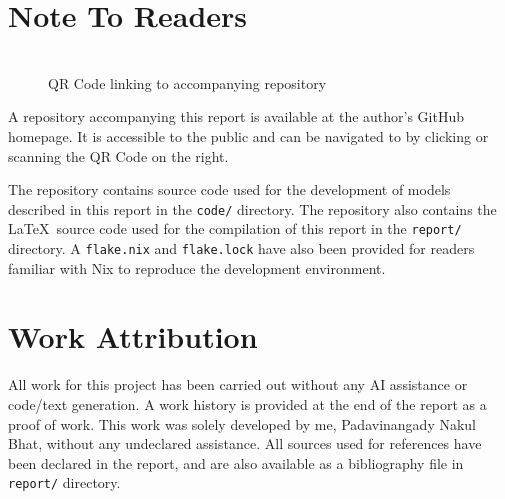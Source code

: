 \begin{abstract}
    This report covers the topics presented in
    the ``Introductions to Large Language Models''
    course taught by Tanmoy Chakraborty and
    Soumen Chakrabarti, available on NPTEL.
    As a graded assignment, the report follows a
    set of seven questions, and accompanies a code
    base available in the repository linked below.
    The report is split into seven sections, each
    corresponding to a question from the assignment.
    Questions will be quoted in full and italicized at the
    start of each section, followed 
    by explanations and code listings where appropriate.
\end{abstract}

\section*{Note To Readers}
\begin{figure}
    \centering
    \\[1em]
    QR Code linking to accompanying repository
\end{figure}
A repository accompanying this report is available
at the author's GitHub homepage. It is accessible
to the public and can be navigated to by clicking or
scanning the QR Code on the right. 

The repository contains source code used
for the development of models described in this
report in the \texttt{code/} directory.
The repository also contains the \LaTeX\ source
code used for the compilation of this report in 
the \texttt{report/} directory.
A \texttt{flake.nix} and \texttt{flake.lock}
have also been provided for readers familiar with Nix to 
reproduce the development environment.

\section*{Work Attribution}
All work for this project has been carried out
without any AI assistance or code/text generation.
A work history is provided at the end of the report
as a proof of work.
This work was solely developed by me, Padavinangady Nakul Bhat,
without any undeclared assistance.
All sources used for references have been declared in
the report, and are also available as a bibliography file
in \texttt{report/} directory.

\vfill
\doclicenseThis
